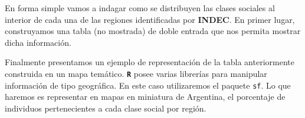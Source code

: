 \documentclass[
]{article}
\newenvironment{Shaded}{\begin{snugshade}}{\end{snugshade}}
\newcommand{\AttributeTok}[1]{\textcolor[rgb]{0.13,0.29,0.53}{#1}}
\newcommand{\CommentTok}[1]{\textcolor[rgb]{0.56,0.35,0.01}{\textit{#1}}}
\newcommand{\DecValTok}[1]{\textcolor[rgb]{0.00,0.00,0.81}{#1}}
\newcommand{\FunctionTok}[1]{\textcolor[rgb]{0.13,0.29,0.53}{\textbf{#1}}}
\newcommand{\NormalTok}[1]{#1}
\newcommand{\OtherTok}[1]{\textcolor[rgb]{0.56,0.35,0.01}{#1}}
\newcommand{\SpecialCharTok}[1]{\textcolor[rgb]{0.81,0.36,0.00}{\textbf{#1}}}
\newcommand{\StringTok}[1]{\textcolor[rgb]{0.31,0.60,0.02}{#1}}
\begin{document}
En forma simple vamos a indagar como se distribuyen las clases sociales al interior de cada una de las regiones identificadas por \textbf{INDEC}. En primer lugar, construyamos una tabla (no mostrada) de doble entrada que nos permita mostrar dicha información.

\begin{Shaded}
\end{Shaded}

Finalmente presentamos un ejemplo de representación de la tabla anteriormente construida en un mapa temático. \textbf{\texttt{R}} posee varias librerías para manipular información de tipo geográfica. En este caso utilizaremos el paquete \texttt{sf}. Lo que haremos es representar en mapas en miniatura de Argentina, el porcentaje de individuos pertenecientes a cada clase social por región.
\end{document}
